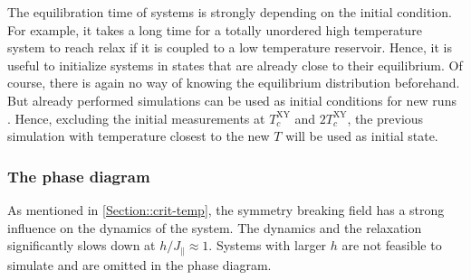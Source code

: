 	The equilibration time of systems is strongly depending on the initial condition. For example, it takes a long time for a totally unordered high temperature system to reach relax if it is coupled to a low temperature reservoir. Hence, it is useful to initialize systems in states that are already close to their equilibrium. Of course, there is again no way of knowing the equilibrium distribution beforehand. But already performed simulations can be used as initial conditions for new runs . Hence, excluding the initial measurements at $T_c^{\text{XY}}$ and $2T_c^{\text{XY}}$, the previous simulation with temperature closest to the new $T$ will be used as initial state.
	\subsubsection{The phase diagram}
	As mentioned in \autoref{Section::crit-temp}, the symmetry breaking field has a strong influence on the dynamics of the system. The dynamics and the relaxation significantly slows down at $ h / J_\parallel \approx 1$. Systems with larger $h$ are not feasible to simulate and are omitted in the phase diagram. \\
	
